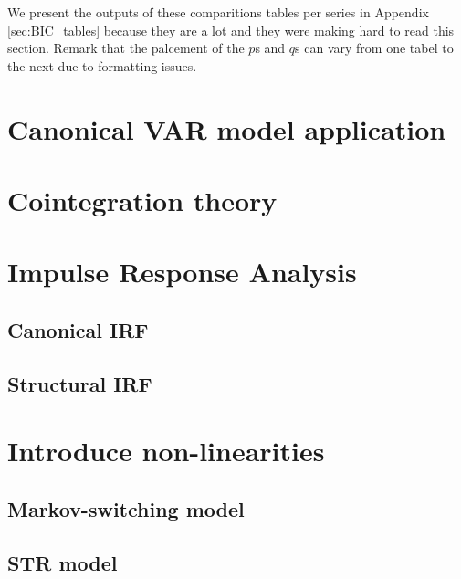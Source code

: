 \documentclass[hidelinks,12pts]{article}
\DeclareMathOperator{\1}{\mathbbm{1}}
\begin{document}
We present the outputs of these comparitions tables per series in Appendix \ref{sec:BIC_tables} because they are a lot and they were making hard to read this section. 
Remark that the palcement of the $p$s and $q$s can vary from one tabel to the next due to formatting issues. 














\section{Canonical VAR model application}\label{sec:var}





\section{Cointegration theory}\label{sec:cointegration}




\section{Impulse Response Analysis}\label{sec:irf}
    \subsection{Canonical IRF}\label{sec:canonical_irf}


    \subsection{Structural IRF}\label{sec:structural_irf}



\section{Introduce non-linearities}\label{sec:nonlinearities}
    \subsection{Markov-switching model}\label{sec:markov}

    
    \subsection{STR model}\label{sec:str}
\end{document}
